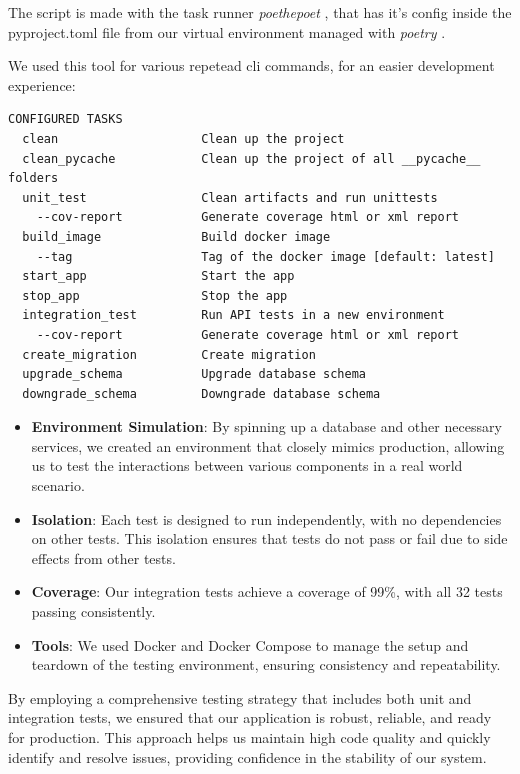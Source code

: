 The script is made with the task runner \textit{poethepoet} \cite{poethepoet}, that has it's config inside the pyproject.toml file from our virtual environment managed with \textit{poetry} \cite{poetry}.

We used this tool for various repetead cli commands, for an easier development experience:

\begin{lstlisting}[language={}]
CONFIGURED TASKS
  clean                    Clean up the project
  clean_pycache            Clean up the project of all __pycache__ folders
  unit_test                Clean artifacts and run unittests
    --cov-report           Generate coverage html or xml report
  build_image              Build docker image
    --tag                  Tag of the docker image [default: latest]
  start_app                Start the app
  stop_app                 Stop the app
  integration_test         Run API tests in a new environment
    --cov-report           Generate coverage html or xml report
  create_migration         Create migration
  upgrade_schema           Upgrade database schema
  downgrade_schema         Downgrade database schema
\end{lstlisting}

\begin{itemize}
    \item \textbf{Environment Simulation}: By spinning up a database and other necessary services, we created an environment that closely mimics production, allowing us to test the interactions between various components in a real world scenario.
    \item \textbf{Isolation}: Each test is designed to run independently, with no dependencies on other tests. This isolation ensures that tests do not pass or fail due to side effects from other tests.
    \item \textbf{Coverage}: Our integration tests achieve a coverage of 99\%, with all 32 tests passing consistently.
    \item \textbf{Tools}: We used Docker and Docker Compose to manage the setup and teardown of the testing environment, ensuring consistency and repeatability.
\end{itemize}

By employing a comprehensive testing strategy that includes both unit and integration tests, we ensured that our application is robust, reliable, and ready for production. This approach helps us maintain high code quality and quickly identify and resolve issues, providing confidence in the stability of our system.

